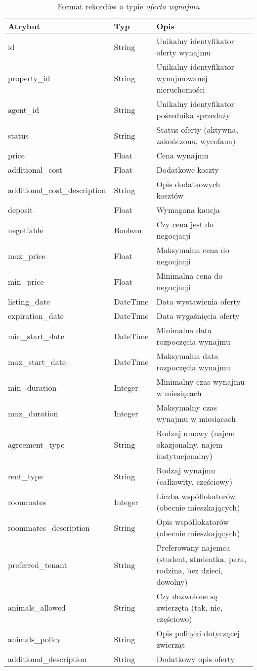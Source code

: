 \begin{table}[H]
    \caption{Format rekordów o typie \textit{oferta wynajmu}}
    \centering
    \begin{tabular}{|l|l|l|}
    \hline
    \textbf{Atrybut} & \textbf{Typ} & \textbf{Opis} \\
    \hline
    id & String & Unikalny identyfikator oferty wynajmu \\
    property\_id & String & Unikalny identyfikator wynajmowanej nieruchomości \\
    agent\_id & String & Unikalny identyfikator pośrednika sprzedaży \\
    status & String & Status oferty (aktywna, zakończona, wycofana) \\
    price & Float & Cena wynajmu \\
    additional\_cost & Float & Dodatkowe koszty \\
    additional\_cost\_description & String & Opis dodatkowych kosztów \\
    deposit & Float & Wymagana kaucja \\
    negotiable & Boolean & Czy cena jest do negocjacji \\    
    max\_price & Float & Maksymalna cena do negocjacji \\
    min\_price & Float & Minimalna cena do negocjacji \\
    listing\_date & DateTime & Data wystawienia oferty \\
    expiration\_date & DateTime & Data wygaśnięcia oferty \\
    min\_start\_date & DateTime & Minimalna data rozpoczęcia wynajmu \\
    max\_start\_date & DateTime & Maksymalna data rozpoczęcia wynajmu \\
    min\_duration & Integer & Minimalny czas wynajmu w miesiącach \\
    max\_duration & Integer & Maksymalny czas wynajmu w miesiącach \\
    agreement\_type & String & Rodzaj umowy (najem okazjonalny, najem instytucjonalny) \\
    rent\_type & String & Rodzaj wynajmu (całkowity, częściowy) \\
    roommates & Integer & Liczba współlokatorów (obecnie mieszkających) \\
    roommates\_description & String & Opis współlokatorów (obecnie mieszkających) \\
    preferred\_tenant & String & Preferowany najemca (student, studentka, para, rodzina, bez dzieci, dowolny) \\
    animals\_allowed & String & Czy dozwolone są zwierzęta (tak, nie, częściowo) \\
    animals\_policy & String & Opis polityki dotyczącej zwierząt \\
    additional\_description & String & Dodatkowy opis oferty \\
    \hline
    \end{tabular}
    \label{tab:sell_offer_details}
\end{table}

